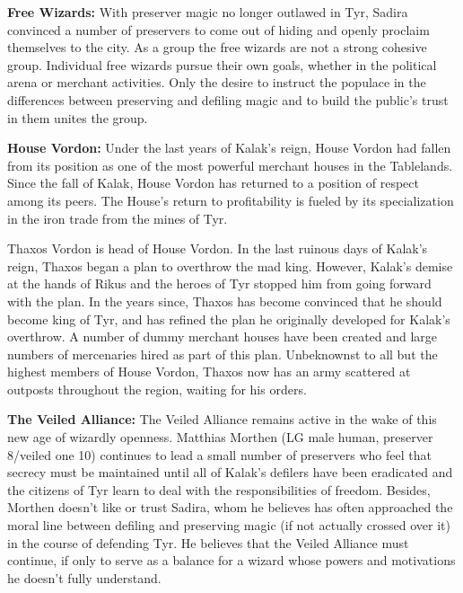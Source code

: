 {
	\textbf{Free Wizards:} With preserver magic no longer outlawed in Tyr, Sadira convinced a number of preservers to come out of hiding and openly proclaim themselves to the city. As a group the free wizards are not a strong cohesive group. Individual free wizards pursue their own goals, whether in the political arena or merchant activities. Only the desire to instruct the populace in the differences between preserving and defiling magic and to build the public's trust in them unites the group.

	\textbf{House Vordon:} Under the last years of Kalak's reign, House Vordon had fallen from its position as one of the most powerful merchant houses in the Tablelands. Since the fall of Kalak, House Vordon has returned to a position of respect among its peers. The House's return to profitability is fueled by its specialization in the iron trade from the mines of Tyr.

	Thaxos Vordon is head of House Vordon. In the last ruinous days of Kalak's reign, Thaxos began a plan to overthrow the mad king. However, Kalak's demise at the hands of Rikus and the heroes of Tyr stopped him from going forward with the plan. In the years since, Thaxos has become convinced that he should become king of Tyr, and has refined the plan he originally developed for Kalak's overthrow. A number of dummy merchant houses have been created and large numbers of mercenaries hired as part of this plan. Unbeknownst to all but the highest members of House Vordon, Thaxos now has an army scattered at outposts throughout the region, waiting for his orders.

	\textbf{The Veiled Alliance:} The Veiled Alliance remains active in the wake of this new age of wizardly openness. Matthias Morthen (LG male human, preserver 8/veiled one 10) continues to lead a small number of preservers who feel that secrecy must be maintained until all of Kalak's defilers have been eradicated and the citizens of Tyr learn to deal with the responsibilities of freedom. Besides, Morthen doesn't like or trust Sadira, whom he believes has often approached the moral line between defiling and preserving magic (if not actually crossed over it) in the course of defending Tyr. He believes that the Veiled Alliance must continue, if only to serve as a balance for a wizard whose powers and motivations he doesn't fully understand.
}
